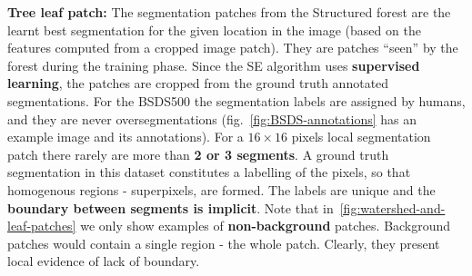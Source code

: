 \textbf{Tree leaf patch:} The segmentation patches from the Structured forest are the learnt best segmentation for the given location in the image (based on the features computed from a cropped image patch). They are patches ``seen'' by the forest during the training phase. Since the SE algorithm uses \textbf{supervised learning}, the patches are cropped from the ground truth annotated segmentations. 
For the BSDS500 the segmentation labels  are assigned by humans, and they are never oversegmentations (fig.~\ref{fig:BSDS-annotations} has an example image and its annotations). 
For a $16\times 16$ pixels local segmentation patch there rarely are more than \textbf{2 or 3 segments}. 
A ground truth segmentation in this dataset constitutes a labelling of the pixels, so that homogenous regions - superpixels, are formed. The labels are unique and the \textbf{boundary between segments is implicit}.
Note that in~\ref{fig:watershed-and-leaf-patches} we only show examples of \textbf{non-background} patches. Background patches would contain a single region - the whole patch. Clearly, %
they present local evidence of lack of boundary.

